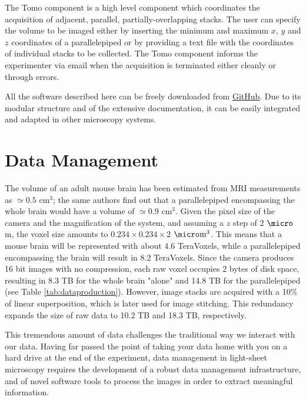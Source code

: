 \documentclass[12pt]{spieman}  %
\begin{document}
The Tomo component is a high level component which coordinates the acquisition of adjacent, parallel, partially-overlapping stacks. %
The user can specify the volume to be imaged either by inserting the minimum and maximum $x$, $y$ and $z$ coordinates of a parallelepiped or by providing a text file with the coordinates of individual stacks to be collected. The Tomo component informs the experimenter via email when the acquisition is terminated either cleanly or through errors.

All the software described here can be freely downloaded from \href{https://github.com/marcelvanthoff/Giorgio}{GitHub}. Due to its modular structure and of the extensive documentation, it can be easily integrated and adapted in other microscopy systems.

\section{Data Management}
The volume of an adult mouse brain has been estimated from MRI measurements \cite{Kovacevic2005} as $\simeq 0.5$ $\text{cm}^3$; the same authors find out that a parallelepiped encompassing the whole brain would have a volume of $\simeq 0.9$ $\text{cm}^3$. Given the pixel size of the camera and the magnification of the system, and assuming a $z$ step of 2 $\micro$m, the voxel size amounts to $0.234\times0.234\times2$ $\micro\text{m}^3$. This means that a mouse brain will be represented with about 4.6 TeraVoxels, while a parallelepiped encompassing the brain will result in 8.2 TeraVoxels. Since the camera produces 16 bit images with no compression, each raw voxel occupies 2 bytes of disk space, resulting in 8.3 TB for the whole brain "alone" and 14.8 TB for the parallelepiped (see Table \ref{tab:dataproduction}). However, image stacks are acquired with a 10\% of linear superposition, which is later used for image stitching. This redundancy expands the size of raw data to 10.2 TB and 18.3 TB, respectively.

This tremendous amount of data challenges the traditional way we interact with our data. Having far passed the point of taking your data home with you on a hard drive at the end of the experiment, data management in light-sheet microscopy requires the development of a robust data management infrastructure, and of novel software tools to process the images in order to extract meaningful information.
\end{document}
